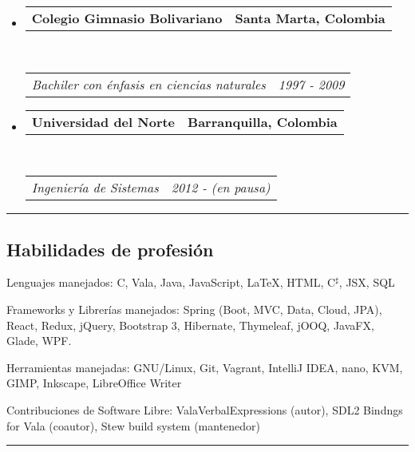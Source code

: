 \documentclass[10pt,a4paper]{article}
\makeatletter
\newenvironment{indentsection}[1]%
{\begin{list}{}%
	{\setlength{\leftmargin}{#1}}%
	\item[]%
}
{\end{list}}
\newcommand{\headerrow}[2]
{\begin{tabular*}{\linewidth}{l@{\extracolsep{\fill}}r}
	#1 &
	#2 \\
\end{tabular*}}
\makeatother
\begin{document}
\begin{itemize}
	\parskip=0.1em

	\item 
	\headerrow
		{\textbf{Colegio Gimnasio Bolivariano}}
		{\textbf{Santa Marta, Colombia}}
	\\
	\headerrow
		{\emph{Bachiler con énfasis en ciencias naturales}}
		{\emph{1997 - 2009}}

	\item 
	\headerrow
	{\textbf{Universidad del Norte}}
	{\textbf{Barranquilla, Colombia}}
	\\
	\headerrow
	{\emph{Ingeniería de Sistemas}}
	{\emph{2012 - (en pausa)}}
	

\end{itemize}


\hrule
\vspace{-0.4em}
\subsection*{Habilidades de profesión}

\begin{indentsection}{\parindent}
\begin{description*}
	\item[Lenguajes manejados:]
	C, Vala, Java, JavaScript, \LaTeX, HTML, C{$^\sharp$}, JSX, SQL
	\item[Frameworks y Librerías manejados:]
	Spring (Boot, MVC, Data, Cloud, JPA), React, Redux, jQuery, Bootstrap 3, Hibernate, Thymeleaf, jOOQ, JavaFX, Glade, WPF.
	\item[Herramientas manejadas:]
	GNU/Linux, Git, Vagrant, IntelliJ IDEA, nano, KVM, GIMP, Inkscape, LibreOffice Writer
	\item[Contribuciones de Software Libre:]
	ValaVerbalExpressions (autor), SDL2 Bindngs for Vala (coautor), Stew build system (mantenedor)
\end{description*}
\end{indentsection}
\hrule
\vspace{-0.4em}
\end{document}
